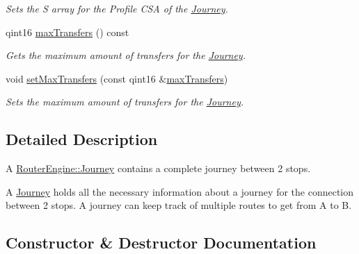 \begin{DoxyCompactItemize}
\begin{DoxyCompactList}\small\item\em Sets the S array for the Profile C\+SA of the \mbox{\hyperlink{classQRail_1_1RouterEngine_1_1Journey}{Journey}}. \end{DoxyCompactList}\item 
qint16 \mbox{\hyperlink{classQRail_1_1RouterEngine_1_1Journey_aa32ea56927a1727c3ab17b6ae584bbed}{max\+Transfers}} () const
\begin{DoxyCompactList}\small\item\em Gets the maximum amount of transfers for the \mbox{\hyperlink{classQRail_1_1RouterEngine_1_1Journey}{Journey}}. \end{DoxyCompactList}\item 
void \mbox{\hyperlink{classQRail_1_1RouterEngine_1_1Journey_ae05e37a29d946f407d3e85e44665b420}{set\+Max\+Transfers}} (const qint16 \&\mbox{\hyperlink{classQRail_1_1RouterEngine_1_1Journey_aa32ea56927a1727c3ab17b6ae584bbed}{max\+Transfers}})
\begin{DoxyCompactList}\small\item\em Sets the maximum amount of transfers for the \mbox{\hyperlink{classQRail_1_1RouterEngine_1_1Journey}{Journey}}. \end{DoxyCompactList}\end{DoxyCompactItemize}


\subsection{Detailed Description}
A \mbox{\hyperlink{classQRail_1_1RouterEngine_1_1Journey}{Router\+Engine\+::\+Journey}} contains a complete journey between 2 stops. 

A \mbox{\hyperlink{classQRail_1_1RouterEngine_1_1Journey}{Journey}} holds all the necessary information about a journey for the connection between 2 stops. A journey can keep track of multiple routes to get from A to B. 

\subsection{Constructor \& Destructor Documentation}
\mbox{\label{classQRail_1_1RouterEngine_1_1Journey_af49050161e106f4c47cbddc8d82ebaa0}} 
